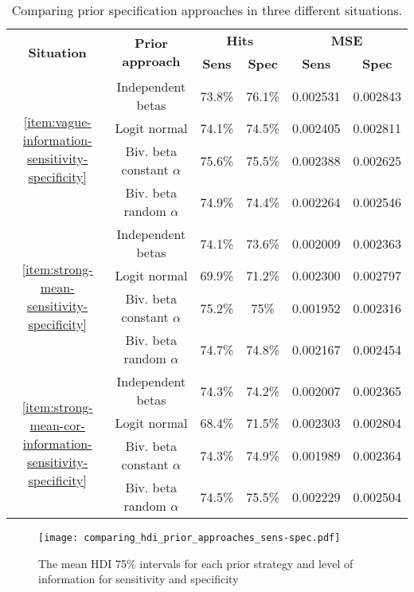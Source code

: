 \begin{table}[]
  \centering
  \caption{\label{tab:comparison-prior-approach-sensitivity-specificity}Comparing
  prior specification approaches in three different situations.}
  \begin{tabular}{cccccc}
    \hline
    \multirow{2}{*}{\textbf{Situation}} & \multirow{2}{*}{\textbf{Prior approach}} & \multicolumn{2}{c}{\textbf{Hits}} & \multicolumn{2}{c}{\textbf{MSE}} \\ \cline{3-6} 
     &  & \textbf{Sens} & \textbf{Spec} & \textbf{Sens} & \textbf{Spec} \\ \hline
    \multirow{4}{*}{\autoref{item:vague-information-sensitivity-specificity}} & Independent betas & 73.8\% & 76.1\% & 0.002531 & 0.002843 \\
     & Logit normal & 74.1\% & 74.5\% & 0.002405 & 0.002811 \\
     & Biv. beta constant $\alpha$ & 75.6\% & 75.5\% & 0.002388 & 0.002625 \\
     & Biv. beta random $\alpha$ & 74.9\% & 74.4\% & 0.002264 & 0.002546 \\
    \multirow{4}{*}{\autoref{item:strong-mean-sensitivity-specificity}} & Independent betas & 74.1\% & 73.6\% & 0.002009 & 0.002363 \\
     & Logit normal & 69.9\% & 71.2\% & 0.002300 & 0.002797 \\
     & Biv. beta constant $\alpha$ & 75.2\% & 75\% & 0.001952 & 0.002316 \\
     & Biv. beta random $\alpha$ & 74.7\% & 74.8\% & 0.002167 & 0.002454 \\
    \multirow{4}{*}{\autoref{item:strong-mean-cor-information-sensitivity-specificity}} & Independent betas & 74.3\% & 74.2\% & 0.002007 & 0.002365 \\
     & Logit normal & 68.4\% & 71.5\% & 0.002303 & 0.002804 \\
     & Biv. beta constant $\alpha$ & 74.3\% & 74.9\% & 0.001989 & 0.002364 \\
     & Biv. beta random $\alpha$ & 74.5\% & 75.5\% & 0.002229 & 0.002504 \\ \hline
    \end{tabular}
  \end{table}

\begin{figure}
  \centering
  \caption{\label{fig:comparing_hdi_prior_approaches_sens-spec} The mean HDI 75\% intervals
  for each prior strategy and level of information for sensitivity and specificity}
  \texttt{[image: comparing\_hdi\_prior\_approaches\_sens-spec.pdf]}
\end{figure}

